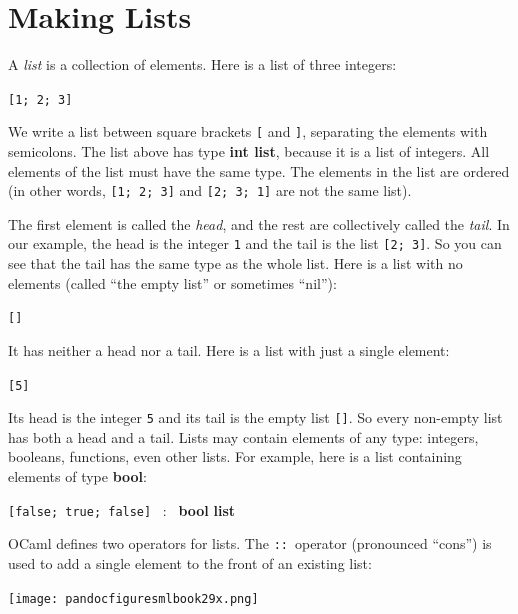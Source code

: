 \documentclass[]{book}
\newcommand{\smspace}{\vspace{4mm}}
\begin{document}
\cleardoublepage
\thispagestyle{empty}

\thispagestyle{empty}


\chapter{Making Lists}
A \textit{list} is a collection of elements. Here is a list of three integers:

\smspace
\verb![1; 2; 3]!
\smspace

\noindent We write a list between square brackets \texttt{[} and \texttt{]}, separating the elements with semicolons. The list above has type \textsf{\textbf{int list}}, because it is a list of integers. All elements of the list must have the same type. The elements in the list are ordered (in other words, \texttt{[1; 2; 3]} and \texttt{[2; 3; 1]} are not the same list).

The first element is called the \textit{head}, and the rest are collectively called the \textit{tail}. In our example, the head is the integer \verb!1! and the tail is the list \texttt{[2; 3]}. So you can see that the tail has the same type as the whole list. Here is a list with no elements (called ``the empty list'' or sometimes ``nil''):

\smspace
\verb![]!
\smspace

\noindent It has neither a head nor a tail. Here is a list with just a single element:

\smspace
\verb![5]!
\smspace

\noindent Its head is the integer \texttt{5} and its tail is the empty list \texttt{[]}. So every non-empty list has both a head and a tail. Lists may contain elements of any type: integers, booleans, functions, even other lists. For example, here is a list containing elements of type \textbf{\textsf{bool}}:

\smspace
\texttt{[false; true; false]} \ : \ \textsf{\textbf{bool}} \textsf{\textbf{list}}
\smspace

\noindent OCaml defines two operators for lists. The \texttt{::}\ operator (pronounced ``cons'') is used to add a single element to the front of an existing list:

\medskip
\begin{center}
\noindent\texttt{[image: pandocfiguresmlbook29x.png]}
\end{center}
\medskip
\end{document}
